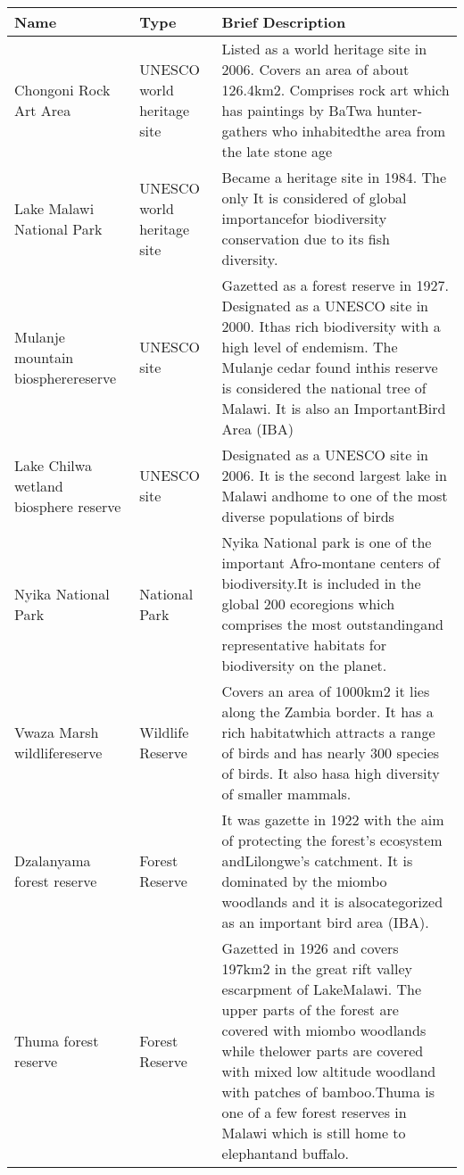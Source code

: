 \documentclass[
]{book}
\begin{document}
\begin{longtable}[]{@{}
  >{\raggedright\arraybackslash}p{}
  >{\raggedright\arraybackslash}p{}
  >{\raggedright\arraybackslash}p{}@{}}
\toprule
\textbf{Name} & \textbf{Type} & \textbf{Brief Description} \\
\midrule
\endhead
Chongoni Rock Art Area & UNESCO world heritage site & Listed as a world heritage site in 2006. Covers an area of about 126.4km2. Comprises rock art which has paintings by BaTwa hunter-gathers who inhabitedthe area from the late stone age \\
Lake Malawi National Park & UNESCO world heritage site & Became a heritage site in 1984. The only It is considered of global importancefor biodiversity conservation due to its fish diversity. \\
Mulanje mountain biospherereserve & UNESCO site & Gazetted as a forest reserve in 1927. Designated as a UNESCO site in 2000. Ithas rich biodiversity with a high level of endemism. The Mulanje cedar found inthis reserve is considered the national tree of Malawi. It is also an ImportantBird Area (IBA) \\
Lake Chilwa wetland biosphere reserve & UNESCO site & Designated as a UNESCO site in 2006. It is the second largest lake in Malawi andhome to one of the most diverse populations of birds \\
Nyika National Park & National Park & Nyika National park is one of the important Afro-montane centers of biodiversity.It is included in the global 200 ecoregions which comprises the most outstandingand representative habitats for biodiversity on the planet. \\
Vwaza Marsh wildlifereserve & Wildlife Reserve & Covers an area of 1000km2 it lies along the Zambia border. It has a rich habitatwhich attracts a range of birds and has nearly 300 species of birds. It also hasa high diversity of smaller mammals. \\
Dzalanyama forest reserve & Forest Reserve & It was gazette in 1922 with the aim of protecting the forest's ecosystem andLilongwe's catchment. It is dominated by the miombo woodlands and it is alsocategorized as an important bird area (IBA). \\
Thuma forest reserve & Forest Reserve & Gazetted in 1926 and covers 197km2 in the great rift valley escarpment of LakeMalawi. The upper parts of the forest are covered with miombo woodlands while thelower parts are covered with mixed low altitude woodland with patches of bamboo.Thuma is one of a few forest reserves in Malawi which is still home to elephantand buffalo. \\

\end{longtable}
\end{document}
